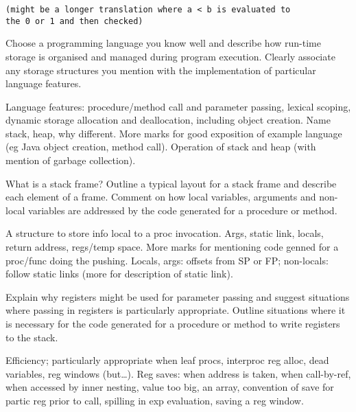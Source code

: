 \documentclass[11pt]{cityexam}
\begin{document}
\begin{questions}
\begin{subquestions}
\begin{modelanswer}
\begin{verbatim}
(might be a longer translation where a < b is evaluated to 
the 0 or 1 and then checked)
\end{verbatim}
\end{modelanswer}

\end{subquestions}

\question


\begin{subquestions}

\subquestion
Choose a programming language you know well and describe
how run-time storage is organised and managed during program 
execution.
Clearly associate any storage structures you
mention with the implementation of particular 
language features.

\begin{modelanswer}
Language features: procedure/method call and parameter passing,
lexical scoping, dynamic storage allocation and deallocation,
including object creation. Name stack, heap, why different.
More marks for good exposition of example language
(eg Java object creation, method call). Operation of
stack and heap (with mention of garbage collection).
\end{modelanswer}


\subquestion
What is a stack frame?
Outline a typical layout for a stack frame and describe 
each element of a frame. 
Comment on how local variables, arguments and non-local variables
are addressed by the code generated for a procedure or method. 

\begin{modelanswer}
A structure to store info local to a proc invocation.
Args, static link, locals, return address, regs/temp space.
More marks for mentioning code genned for a proc/func doing the
pushing.
Locals, args: offsets from SP or FP; non-locals: follow static links
(more for description of static link).
\end{modelanswer}

\subquestion
Explain why registers might be used for parameter passing and
suggest situations where passing in registers is particularly
appropriate. 
Outline situations where it is necessary for the code generated for a 
procedure or method to write registers to the stack.

\begin{modelanswer}
Efficiency; particularly appropriate when leaf procs, interproc
reg alloc, dead variables, reg windows (but\ldots).
Reg saves: when address is taken,
when call-by-ref,
when accessed by inner nesting,
value too big,
an array,
convention of save for partic reg prior to call,
spilling in exp evaluation,
saving a reg window.
\end{modelanswer}


\end{subquestions}
\end{questions}
\end{document}
